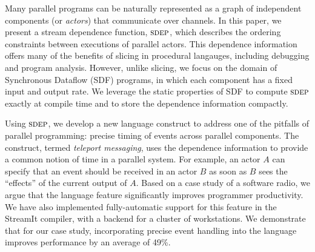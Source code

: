 Many parallel programs can be naturally represented as a graph of
independent components (or {\it actors}) that communicate over
channels.  In this paper, we present a stream dependence
function, $\textsc{sdep}$, which describes the ordering constraints between
executions of parallel actors.  This dependence information offers
many of the benefits of slicing in procedural langauges, including
debugging and program analysis.  However, unlike slicing, we focus on
the domain of Synchronous Dataflow (SDF) programs, in which each
component has a fixed input and output rate.  We leverage the static
properties of SDF to compute $\textsc{sdep}$ exactly at compile time and to
store the dependence information compactly.

Using $\textsc{sdep}$, we develop a new language construct to address one of
the pitfalls of parallel programming: precise timing of events across
parallel components.  The construct, termed {\it teleport messaging},
uses the dependence information to provide a common notion of time in
a parallel system.  For example, an actor $A$ can specify that an
event should be received in an actor $B$ as soon as $B$ sees the
``effects'' of the current output of $A$.  Based on a case study of a
software radio, we argue that the language feature significantly
improves programmer productivity. We have also implemented
fully-automatic support for this feature in the StreamIt compiler,
with a backend for a cluster of workstations.  We demonstrate that for
our case study, incorporating precise event handling into the language
improves performance by an average of 49\%.
